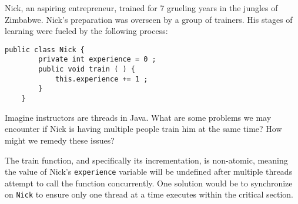 Nick, an aspiring entrepreneur, trained for 7 grueling years in the jungles of Zimbabwe.
    Nick's preparation was overseen by a group of trainers. His stages of learning were
    fueled by the following process:
    \begin{lstlisting}[numbers=none]
    public class Nick {
        private int experience = 0 ;
        public void train ( ) {
            this.experience += 1 ;
        }
    }\end{lstlisting}Imagine instructors are threads in Java. What are some problems
    we may encounter if Nick is having multiple people train him at the same time?
    How might we remedy these issues?

    \begin{answer}
    The train function, and specifically its incrementation, is non-atomic, meaning the value of Nick's 
    \texttt{experience} variable will be undefined after multiple threads attempt to call the function concurrently.  One solution would be to synchronize on \texttt{Nick} to ensure only one thread at a time executes within the critical section.\\
    \end{answer}